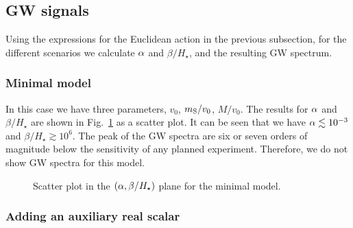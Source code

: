 \documentclass[a4paper,11pt]{article}
\begin{document}
\subsection{GW signals}

Using the expressions for the Euclidean action in the previous subsection, for the different scenarios we calculate $\alpha$ and $\beta/H_{\star}$, and the resulting GW spectrum.

\subsubsection{Minimal model}

In this case we have three parameters, $v_0$,  $m_{\rm S}/v_0$,  $M/v_0$. The results for  $\alpha$ and $\beta/H_\star$ are shown in Fig.~\ref{f1} as a scatter plot. It can be seen that we have $\alpha \lesssim 10^{-3}$
and $\beta/H_\star \gtrsim 10^6$. The peak of the GW spectra are  six or seven orders of magnitude below the sensitivity
of any planned experiment. Therefore, we do not show GW spectra for this model.
\begin{figure}
\begin{center}
\end{center}
\caption{Scatter plot in the $(\alpha, \beta/H_\star)$ plane for the minimal model.}
\label{f1}
\end{figure}

\subsubsection{Adding an auxiliary real scalar}
\end{document}
